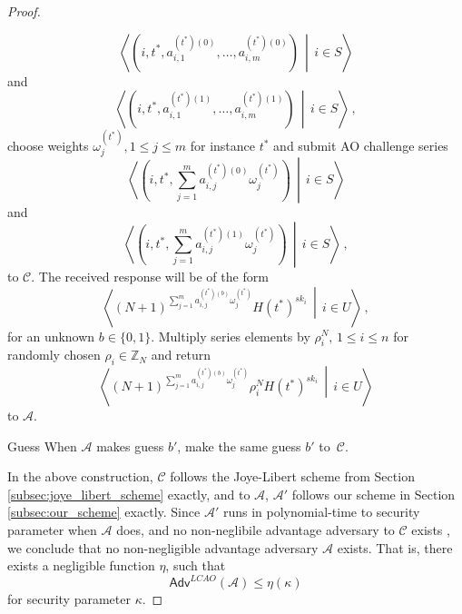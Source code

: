 \documentclass[10pt,letterpaper,oneside,twocolumn,journal]{IEEEtran}
\theoremstyle{definition}
\theoremstyle{definition}
\theoremstyle{remark}
\begin{document}
\begin{proof}
\begin{LaTeXdescription}
\begin{equation*}
            \left\langle\left(i,t^*,a^{(t^*)(0)}_{i,1},\dots,a^{(t^*)(0)}_{i,m}\right)\,\middle|\,i \in S\right\rangle
        \end{equation*}
        and
        \begin{equation*}
            \left\langle\left(i,t^*,a^{(t^*)(1)}_{i,1},\dots,a^{(t^*)(1)}_{i,m}\right)\,\middle|\, i \in S\right\rangle\,,
        \end{equation*}
        choose weights $\omega^{(t^*)}_j,1 \leq j \leq m$ for instance $t^*$ and submit AO challenge series
        \begin{equation*}
            \left\langle\left(i,t^*,\sum^m_{j=1}a^{(t^*)(0)}_{i,j}\omega^{(t^*)}_j\right)\,\middle|\,i \in S\right\rangle
        \end{equation*}
        and
        \begin{equation*}
            \left\langle\left(i,t^*,\sum^m_{j=1}a^{(t^*)(1)}_{i,j}\omega^{(t^*)}_j\right)\,\middle|\,i \in S\right\rangle\,,
        \end{equation*}
        to $\mathcal{C}$. The received response will be of the form 
        \begin{equation*}
            \left\langle(N+1)^{\sum^m_{j=1}a^{(t^*)(b)}_{i,j}\omega^{(t^*)}_j}H(t^*)^{sk_i}\,\middle|\,i\in U\right\rangle\,,
        \end{equation*}
        for an unknown $b \in \{0,1\}$. Multiply series elements by $\rho_i^N,\,1 \leq i \leq n$ for randomly chosen $\rho_i \in \mathbb{Z}_N$ and return
        \begin{equation*}
            \left\langle(N+1)^{\sum^m_{j=1}a^{(t^*)(b)}_{i,j}\omega^{(t^*)}_j}\rho_i^N H(t^*)^{sk_i}\,\middle|\,i\in U\right\rangle
        \end{equation*}
        to $\mathcal{A}$.
        \item[Guess] When $\mathcal{A}$ makes guess $b'$, make the same guess $b'$ to~$\mathcal{C}$.
    \end{LaTeXdescription}

    In the above construction, $\mathcal{C}$ follows the Joye-Libert scheme from Section \ref{subsec:joye_libert_scheme} exactly, and to $\mathcal{A}$, $\mathcal{A}'$ follows our scheme in Section \ref{subsec:our_scheme} exactly. Since $\mathcal{A}'$ runs in polynomial-time to security parameter when $\mathcal{A}$ does, and no non-neglibile advantage adversary to $\mathcal{C}$ exists \cite{joyeScalableSchemePrivacyPreserving2013}, we conclude that no non-negligible advantage adversary $\mathcal{A}$ exists. That is, there exists a negligible function $\eta$, such that
    \begin{equation*}
        \mathsf{Adv}^{LCAO}(\mathcal{A}) \leq \eta(\kappa)
    \end{equation*}
    for security parameter $\kappa$.
\end{proof}
\end{document}
